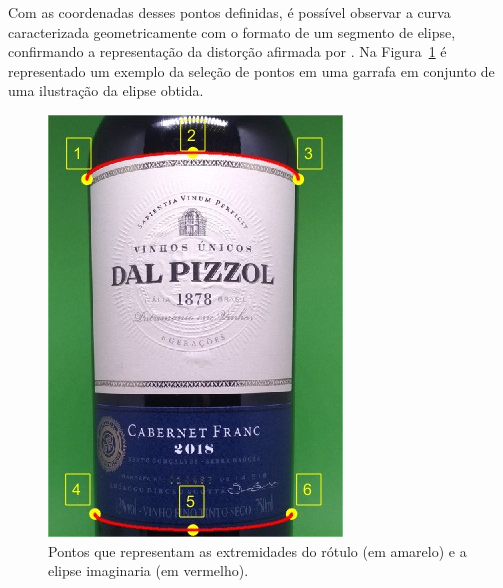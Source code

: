 Com as coordenadas desses pontos definidas, é possível observar a curva caracterizada geometricamente com o formato de um segmento de elipse, confirmando a representação da distorção afirmada por \cite{Lin:2013}. Na Figura~\ref{fig:elipse} é representado um exemplo da seleção de pontos em uma garrafa em conjunto de uma ilustração da elipse obtida.


\begin{figure}[htb]
    \caption{Pontos que representam as extremidades do rótulo (em amarelo) e a elipse imaginaria (em vermelho).}
    \centering
    \vspace{0.3cm}
    \begin{minipage}{0.4\textwidth}
      \centering
         \includegraphics[width=\textwidth]{TCC/Imagens/ellipse.jpg}
	\end{minipage}
    \label{fig:elipse}
\end{figure}

